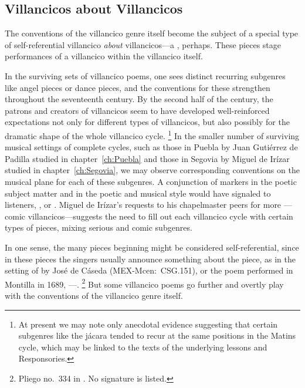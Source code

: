 \subsection{%
Villancicos about Villancicos
}

The conventions of the villancico genre itself become the subject of a special type of self-referential villancico \emph{about} villancicos---a , perhaps.
These pieces stage performances of a villancico within the villancico itself.

In the surviving sets of villancico poems, one sees distinct recurring subgenres like angel pieces or dance pieces, and the conventions for these strengthen throughout the seventeenth century.
By the second half of the century, the patrons and creators of villancicos seem to have developed well-reinforced expectations not only for different types of villancicos, but also possibly for the dramatic shape of the whole villancico cycle.%
	\footnote{%
	At present we may note only anecdotal evidence suggesting that certain subgenres like the jácara tended to recur at the same positions in the Matins cycle, which may be linked to the texts of the underlying lessons and Responsories.
	}
In the smaller number of surviving musical settings of complete cycles, such as those in Puebla by Juan Gutiérrez de Padilla studied in chapter~\ref{ch:Puebla} and those in Segovia by Miguel de Irízar studied in chapter~\ref{ch:Segovia}, we may observe corresponding conventions on the musical plane for each of these subgenres.
A conjunction of markers in the poetic subject matter and in the poetic and musical style would have signaled to listeners, , or .
Miguel de Irízar's requests to his chapelmaster peers for more ---comic villancicos---suggests the need to fill out each villancico cycle with certain types of pieces, mixing serious and comic subgenres.%
	\autocite[78]{Olarte:Irizar}

In one sense, the many pieces beginning   might be considered self-referential, since in these pieces the singers usually announce something about the piece, as in the setting of  by José de Cáseda (MEX-Mcen:~CSG.151), or the poem performed in Montilla in 1689, ---.%
	\footnote{%
	Pliego no.~334 in \autocite[116]{BNE:VCs17C}.
	No signature is listed.
	}
But some villancico poems go further and overtly play with the conventions of the villancico genre itself.


